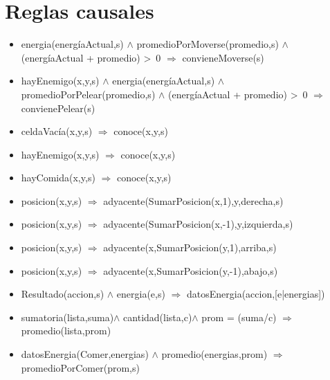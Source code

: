 \section{Reglas causales}

\begin{itemize}

\item  energia(energíaActual,s)
$\land$ promedioPorMoverse(promedio,s) $\land$ (energíaActual + promedio) >~0
$\Rightarrow$ convieneMoverse(s)

\item hayEnemigo(x,y,s) $\land$ energia(energíaActual,s)
$\land$ promedioPorPelear(promedio,s) $\land$ (energíaActual + promedio) >~0
$\Rightarrow$ convienePelear(s)

\item celdaVacía(x,y,s) $\Rightarrow$
 conoce(x,y,s)
 
\item hayEnemigo(x,y,s) $\Rightarrow$
 conoce(x,y,s)

\item hayComida(x,y,s) $\Rightarrow$
 conoce(x,y,s)

\item posicion(x,y,s) $\Rightarrow$ adyacente(SumarPosicion(x,1),y,derecha,s)

\item posicion(x,y,s) $\Rightarrow$ adyacente(SumarPosicion(x,-1),y,izquierda,s)

\item posicion(x,y,s) $\Rightarrow$ adyacente(x,SumarPosicion(y,1),arriba,s)

\item posicion(x,y,s) $\Rightarrow$ adyacente(x,SumarPosicion(y,-1),abajo,s)

\item Resultado(accion,s) $\land$ energia(e,s) 
$\Rightarrow$
     datosEnergia(accion,[e|energias])
     
\item sumatoria(lista,suma)$\land$ cantidad(lista,c)$\land$ prom = (suma/c)
\newline
       $\Rightarrow$ promedio(lista,prom)

\item  datosEnergia(Comer,energias) $\land$ 
 promedio(energias,prom) $\Rightarrow$
 promedioPorComer(prom,s)
       

\end{itemize}
